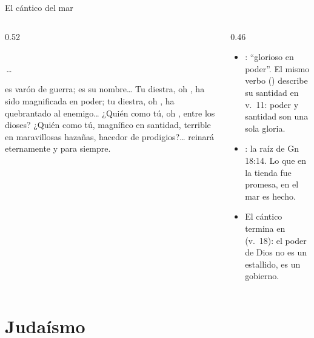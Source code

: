 \begin{frame}{El cántico del mar}
\begin{columns}[t,onlytextwidth]
\begin{column}{0.52\textwidth}
\begin{center}\scriptsize{}\\[1pt]\,\ldots\,\end{center}
\begin{cita}[fontupper=\scriptsize\itshape]\SENOR{} es varón de guerra; \SENOR{} es su nombre\ldots{} Tu diestra, oh \SENOR, ha sido magnificada en poder; tu diestra, oh \SENOR, ha quebrantado al enemigo\ldots{} ¿Quién como tú, oh \SENOR, entre los dioses? ¿Quién como tú, magnífico en santidad, terrible en maravillosas hazañas, hacedor de prodigios?\ldots{} \SENOR{} reinará eternamente y para siempre.\end{cita}
\end{column}
\begin{column}{0.46\textwidth}\small
\begin{itemize}
\item {}: ``glorioso en poder''. El mismo verbo () describe su santidad en v.~11: poder y santidad son una sola gloria.
\item {}: la raíz de Gn 18:14. Lo que en la tienda fue promesa, en el mar es hecho.
\item El cántico termina en  (v.~18): el poder de Dios no es un estallido, es un gobierno.
\end{itemize}
\end{column}
\end{columns}
\end{frame}

\section{Judaísmo}

